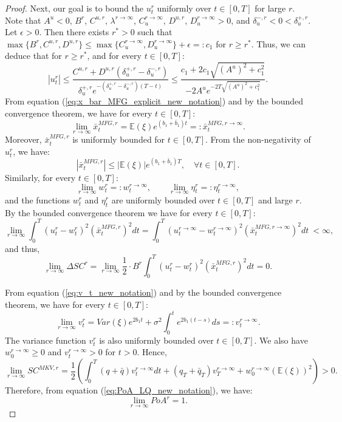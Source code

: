 \documentclass[11pt]{article}
\begin{document}
\begin{proof}
	Next, our goal is to bound the $u^r_t$ uniformly over $t \in [0,T]$ for large $r$.
	Note that  $A^u < 0$, $B^r$, $C^{u,r}$, $\lambda^{r\to \infty}$, $C^{r \to \infty}_u$, $D^{u,r}$, $D^{r \to \infty}_u> 0$, and $\delta^{-,r}_u < 0 < \delta^{+,r}_u$. Let $\epsilon>0$. Then there exists $r^*>0$ such that $\max\{ B^{r}, C^{u,r}, D^{u,r} \} \leq \max\{C^{r \to \infty}_u,D^{r \to \infty}_u \}+\epsilon=: c_1$ for $r \geq r^*$. Thus, we can deduce that for $r \geq r^*$, and for every $t \in [0,T]$:
	\begin{equation*}
	\left\vert u_t^{r} \right\vert \leq \frac{C^{u,r} + D^{u,r} (\delta^{+,r}_u - \delta^{-,r}_u)}{\delta^{+,r}_u e^{- (\delta^{+,r}_u - \delta^{-,r}_u)(T-t)}} 
	\leq  \frac{ c_1 + 2 c_1 \sqrt{(A^u)^2 + c_1^2}  }{-2A^u e^{-2T \sqrt{(A^u)^2 + c_1^2} } }.
	\end{equation*}
	From equation (\ref{eq:x_bar_MFG_explicit_new_notation}) and by the bounded convergence theorem, we have for every $t \in [0,T]$:
	\begin{equation*}
		\lim_{r\to \infty}\bar{x}_t^{MFG,r} = \mathbb{E}(\xi) e^{(b_1+ \bar{b}_1)t} =: \bar{x}_t^{MFG,r\to \infty}.
	\end{equation*}
	Moreover, $\bar{x}_t^{MFG,r}$ is uniformly bounded for $t \in [0,T]$. From the non-negativity of $u^r_t$, we have:
	$$ \left\vert \bar{x}^{MFG,r}_t \right\vert \leq \vert \mathbb{E}(\xi) \vert e^{ (b_1 + \bar{b}_1 ) T }, \quad \forall t \in [0,T]. $$  	
	Similarly, for every $t\in [0,T]$:
	$$\lim_{r\to \infty}w^r_t =: w_t^{r\to \infty},\qquad \lim_{r\to \infty} \eta^r_t =: \eta_t^{r\to \infty},$$
	and the functions $w^{r}_t$ and $\eta^{r}_t$ are uniformly bounded over $t \in[0,T]$ and large $r$. By the bounded convergence theorem we have for every $t \in [0,T]$:
	\begin{equation*}
	\lim_{r \to \infty} \int_0^T (u^r_t - w^r_t)^2 (\bar{x}_t^{MFG,r})^2 dt = \int_0^T (u^{r \to \infty}_t- w^{r \to \infty}_t)^2 (\bar{x}_t^{MFG,r\to \infty})^2 dt \  < \infty,
	\end{equation*}
	and thus,
	\begin{equation*}
	\lim_{r \to \infty} \Delta SC^r = \lim_{r \to \infty} \frac{1}{2}\cdot B^r\int_0^T (u^r_t - w^r_t)^2 ( \bar{x}_t^{MFG,r})^2 dt = 0.
	\end{equation*}
	
	From equation (\ref{eq:v_t_new_notation}) and by the bounded convergence theorem, we have for every $t \in [0,T]$: 
	$$	\lim_{r\to \infty} v^r_t = Var(\xi)e^{2b_1 t} + \sigma^2 \int_0^t e^{2 b_1 (t-s) } ds =: v^{r \to \infty}_t.
	$$
	The variance function $v_t^{r}$ is also uniformly bounded over $t \in [0,T]$. We also have $w^{r \to \infty }_0\geq0$ and $v^{r \to \infty}_t >0$ for $t>0$. Hence,
	\begin{equation*}
		\lim_{r \to \infty} SC^{MKV,r} = \frac{1}{2} \left( \int_0^T (q+\bar{q}) v^{r \to \infty}_t dt + (q_T + \bar{q}_T) v^{r\to \infty}_T + w^{r \to \infty}_0 (\mathbb{E}(\xi))^2 \right)  >0.
	\end{equation*}
	Therefore, from equation (\ref{eq:PoA_LQ_new_notation}), we have: 
	$$\displaystyle \lim_{r \to \infty} PoA^r = 1.$$
	

\end{proof}
\end{document}
